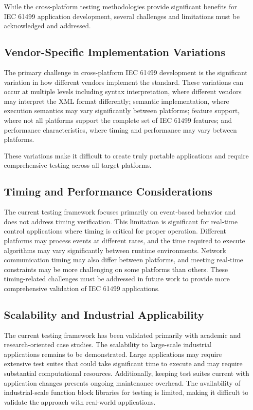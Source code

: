 While the cross-platform testing methodologies provide significant benefits for IEC 61499 application development, several challenges and limitations must be acknowledged and addressed.

\subsection{Vendor-Specific Implementation Variations}

The primary challenge in cross-platform IEC 61499 development is the significant variation in how different vendors implement the standard. These variations can occur at multiple levels including syntax interpretation, where different vendors may interpret the XML format differently; semantic implementation, where execution semantics may vary significantly between platforms; feature support, where not all platforms support the complete set of IEC 61499 features; and performance characteristics, where timing and performance may vary between platforms.

These variations make it difficult to create truly portable applications and require comprehensive testing across all target platforms.

\subsection{Timing and Performance Considerations}

The current testing framework focuses primarily on event-based behavior and does not address timing verification. This limitation is significant for real-time control applications where timing is critical for proper operation. Different platforms may process events at different rates, and the time required to execute algorithms may vary significantly between runtime environments. Network communication timing may also differ between platforms, and meeting real-time constraints may be more challenging on some platforms than others. These timing-related challenges must be addressed in future work to provide more comprehensive validation of IEC 61499 applications.

\subsection{Scalability and Industrial Applicability}

The current testing framework has been validated primarily with academic and research-oriented case studies. The scalability to large-scale industrial applications remains to be demonstrated. Large applications may require extensive test suites that could take significant time to execute and may require substantial computational resources. Additionally, keeping test suites current with application changes presents ongoing maintenance overhead. The availability of industrial-scale function block libraries for testing is limited, making it difficult to validate the approach with real-world applications.

